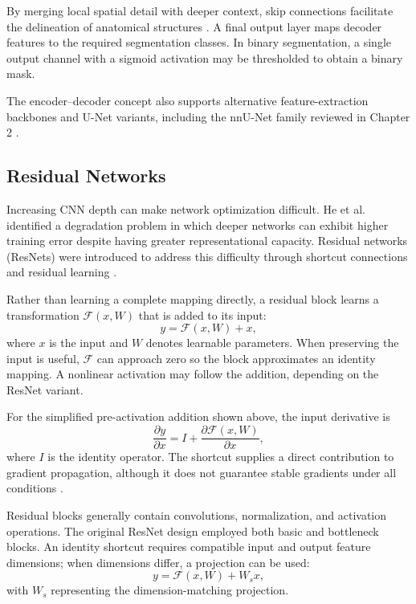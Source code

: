 By merging local spatial detail with deeper context, skip connections facilitate the delineation of anatomical structures \autocite{ronneberger2015unet}. A final output layer maps decoder features to the required segmentation classes. In binary segmentation, a single output channel with a sigmoid activation may be thresholded to obtain a binary mask.

The encoder--decoder concept also supports alternative feature-extraction backbones and U-Net variants, including the nnU-Net family reviewed in Chapter 2 \autocite{isensee2021nnunet}.

\subsection{Residual Networks}

Increasing CNN depth can make network optimization difficult. He et al. identified a degradation problem in which deeper networks can exhibit higher training error despite having greater representational capacity. Residual networks (ResNets) were introduced to address this difficulty through shortcut connections and residual learning \autocite{he2016resnet}.

Rather than learning a complete mapping directly, a residual block learns a transformation $\mathcal{F}(x,W)$ that is added to its input:
\begin{equation}
y=\mathcal{F}(x,W)+x,
\end{equation}
where $x$ is the input and $W$ denotes learnable parameters. When preserving the input is useful, $\mathcal{F}$ can approach zero so the block approximates an identity mapping. A nonlinear activation may follow the addition, depending on the ResNet variant.

For the simplified pre-activation addition shown above, the input derivative is
\begin{equation}
\frac{\partial y}{\partial x}=I+\frac{\partial\mathcal{F}(x,W)}{\partial x},
\end{equation}
where $I$ is the identity operator. The shortcut supplies a direct contribution to gradient propagation, although it does not guarantee stable gradients under all conditions \autocite{he2016resnet}.

Residual blocks generally contain convolutions, normalization, and activation operations. The original ResNet design employed both basic and bottleneck blocks. An identity shortcut requires compatible input and output feature dimensions; when dimensions differ, a projection can be used:
\begin{equation}
y=\mathcal{F}(x,W)+W_sx,
\end{equation}
with $W_s$ representing the dimension-matching projection.

